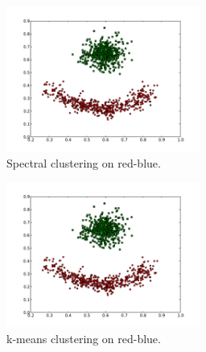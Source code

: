 \documentclass[conference]{IEEEtran}
\begin{document}
\begin{figure}[th]
\centering
\includegraphics[width=15pc]{spectral_red-blue-cluster.pdf}
\caption{Spectral clustering on red-blue.}
\label{spectral_redblue}
\end{figure}

\begin{figure}[th]
\centering
\includegraphics[width=15pc]{kmeans_red-blue-clusters.pdf}
\caption{k-means clustering on red-blue.}
\label{kmeans_redblue}
\end{figure}
\end{document}
